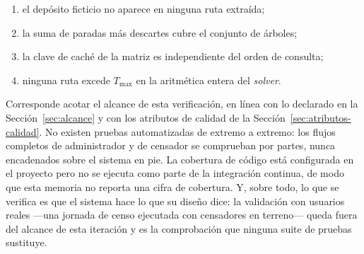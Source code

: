 \renewcommand{\labelenumi}{\alph{enumi})}
\begin{enumerate}
  \item el depósito ficticio no aparece en ninguna ruta extraída;
  \item la suma de paradas más descartes cubre el conjunto de árboles;
  \item la clave de caché de la matriz es independiente del orden de consulta;
  \item ninguna ruta excede $T_{\max}$ en la aritmética entera del \textit{solver}.
\end{enumerate}
\renewcommand{\labelenumi}{\arabic{enumi}.}

Corresponde acotar el alcance de esta verificación, en línea con lo declarado en la
Sección~\ref{sec:alcance} y con los atributos de calidad de la
Sección~\ref{sec:atributos-calidad}. No existen pruebas automatizadas de extremo a extremo: los
flujos completos de administrador y de censador se comprueban por partes, nunca
encadenados sobre el sistema en pie. La cobertura de código está configurada en el
proyecto pero no se ejecuta como parte de la integración continua, de modo que esta
memoria no reporta una cifra de cobertura. Y, sobre todo, lo que se verifica es que
el sistema hace lo que su diseño dice: la validación con usuarios reales ---una
jornada de censo ejecutada con censadores en terreno--- queda fuera del alcance de
esta iteración y es la comprobación que ninguna suite de pruebas sustituye.
